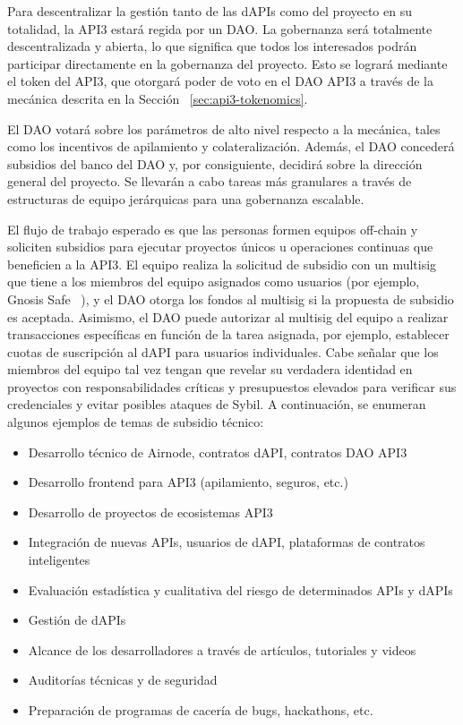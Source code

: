 \documentclass[11pt]{article}
\begin{document}
Para descentralizar la gestión tanto de las dAPIs como del proyecto en su totalidad, la API3 estará regida por un DAO. La gobernanza será totalmente descentralizada y abierta, lo que significa que todos los interesados podrán participar directamente en la gobernanza del proyecto. Esto se logrará mediante el token del API3, que otorgará poder de voto en el DAO API3 a través de la mecánica descrita en la Sección ~\ref{sec:api3-tokenomics}.

El DAO votará sobre los parámetros de alto nivel respecto a la mecánica, tales como los incentivos de apilamiento y colateralización. Además, el DAO concederá subsidios del banco del DAO y, por consiguiente, decidirá sobre la dirección general del proyecto. Se llevarán a cabo tareas más granulares a través de estructuras de equipo jerárquicas para una gobernanza escalable.

El flujo de trabajo esperado es que las personas formen equipos off-chain y soliciten subsidios para ejecutar proyectos únicos u operaciones continuas que beneficien a la API3. El equipo realiza la solicitud de subsidio con un multisig que tiene a los miembros del equipo asignados como usuarios (por ejemplo, Gnosis Safe ~\cite{gnosis}), y el DAO otorga los fondos al multisig si la propuesta de subsidio es aceptada. Asimismo, el DAO puede autorizar al multisig del equipo a realizar transacciones específicas en función de la tarea asignada, por ejemplo, establecer cuotas de suscripción al dAPI para usuarios individuales.   Cabe señalar que los miembros del equipo tal vez tengan que revelar su verdadera identidad en proyectos con responsabilidades críticas y presupuestos elevados para verificar sus credenciales y evitar posibles ataques de Sybil. 
A continuación, se enumeran algunos ejemplos de temas de subsidio técnico:

\begin{itemize}
    \item Desarrollo técnico de Airnode, contratos dAPI, contratos DAO API3
    \item Desarrollo frontend para API3 (apilamiento, seguros, etc.)
    \item Desarrollo de proyectos de ecosistemas API3
    \item Integración de nuevas APIs, usuarios de dAPI, plataformas de contratos inteligentes
    \item Evaluación estadística y cualitativa del riesgo de determinados APIs y dAPIs
    \item Gestión de dAPIs
    \item Alcance de los desarrolladores a través de artículos, tutoriales y videos
    \item Auditorías técnicas y de seguridad
    \item Preparación de programas de cacería de bugs, hackathons, etc.
\end{itemize}
\end{document}
